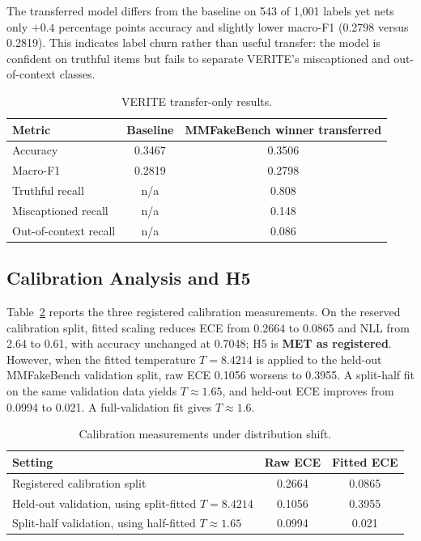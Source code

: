 \documentclass{article} %
\begin{document}
The transferred model differs from the baseline on 543 of 1,001 labels yet nets only \(+0.4\) percentage points accuracy and slightly lower macro-F1 (0.2798 versus 0.2819). This indicates label churn rather than useful transfer: the model is confident on truthful items but fails to separate VERITE's miscaptioned and out-of-context classes.

\begin{table}[t]
\centering
\small
\caption{VERITE transfer-only results.}
\label{tab:verite}
\begin{tabular}{lcc}
\toprule
Metric & Baseline & MMFakeBench winner transferred \\
\midrule
Accuracy & 0.3467 & 0.3506 \\
Macro-F1 & 0.2819 & 0.2798 \\
Truthful recall & n/a & 0.808 \\
Miscaptioned recall & n/a & 0.148 \\
Out-of-context recall & n/a & 0.086 \\
\bottomrule
\end{tabular}
\end{table}

\subsection{Calibration Analysis and H5}
Table~\ref{tab:calib} reports the three registered calibration measurements. On the reserved calibration split, fitted scaling reduces ECE from 0.2664 to 0.0865 and NLL from 2.64 to 0.61, with accuracy unchanged at 0.7048; H5 is \textbf{MET as registered}. However, when the fitted temperature \(T=8.4214\) is applied to the held-out MMFakeBench validation split, raw ECE 0.1056 worsens to 0.3955. A split-half fit on the same validation data yields \(T\approx1.65\), and held-out ECE improves from 0.0994 to 0.021. A full-validation fit gives \(T\approx1.6\).

\begin{table}[t]
\centering
\small
\caption{Calibration measurements under distribution shift.}
\label{tab:calib}
\begin{tabular}{lcc}
\toprule
Setting & Raw ECE & Fitted ECE \\
\midrule
Registered calibration split & 0.2664 & 0.0865 \\
Held-out validation, using split-fitted \(T=8.4214\) & 0.1056 & 0.3955 \\
Split-half validation, using half-fitted \(T\approx1.65\) & 0.0994 & 0.021 \\
\bottomrule
\end{tabular}
\end{table}
\end{document}
